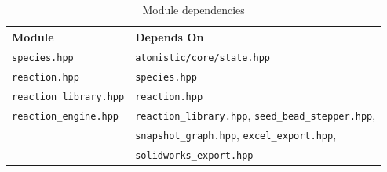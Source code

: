 \documentclass[11pt,a4paper]{article}
\begin{document}
\begin{table}[h]
\centering
\caption{Module dependencies}
\label{tab:deps}
\begin{tabular}{@{}ll@{}}
\toprule
Module & Depends On \\
\midrule
\texttt{species.hpp}          & \texttt{atomistic/core/state.hpp} \\
\texttt{reaction.hpp}         & \texttt{species.hpp} \\
\texttt{reaction\_library.hpp} & \texttt{reaction.hpp} \\
\texttt{reaction\_engine.hpp}  & \texttt{reaction\_library.hpp}, \texttt{seed\_bead\_stepper.hpp}, \\
                                & \texttt{snapshot\_graph.hpp}, \texttt{excel\_export.hpp}, \\
                                & \texttt{solidworks\_export.hpp} \\
\bottomrule
\end{tabular}
\end{table}
\end{document}
